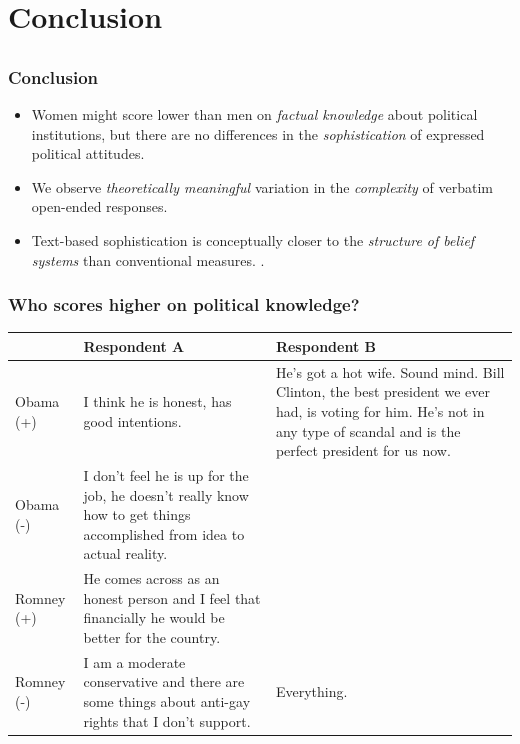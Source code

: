 \documentclass{beamer}
\begin{document}
\section{Conclusion}
\subsection{}
\begin{frame}%
  \frametitle{Conclusion}
  \begin{itemize}
\item Women might score lower than men on \emph{factual knowledge} about political institutions, but there are no differences in the \emph{sophistication} of expressed political attitudes.

\hspace{1em}
\item We observe \emph{theoretically meaningful} variation in the \emph{complexity} of verbatim open-ended responses.
\item Text-based sophistication is conceptually closer to the \emph{structure of belief systems} than conventional measures. \citep[e.g.,][]{tetlock1983cognitive,luskin1987measuring}.
\end{itemize}
\end{frame}

\begin{frame}%
\frametitle{Who scores higher on political knowledge?}
\begin{table}[ht]\footnotesize\centering
\begin{tabular}{l|p{4.5cm}|p{4.5cm}}
   \toprule
    & \textbf{Respondent A} & \textbf{Respondent B} \\ 
    \midrule
  Obama (+) & I think he is honest, has good intentions. & He's got a hot wife. Sound mind. Bill Clinton, the best president we ever had, is voting for him. He's not in any type of scandal and is the perfect president for us now. \\ \hdashline
  Obama (-) & I don't feel he is up for the job, he doesn't really know how to get things accomplished from idea to actual reality. &  \\ \hdashline
  Romney (+) & He comes across as an honest person and I feel that financially he would be better for the country. &  \\ \hdashline
  Romney (-) & I am a moderate conservative and there are some things about anti-gay rights that I don't support. & Everything. \\
    \bottomrule
 \end{tabular}
\end{table}
\end{frame}
\end{document}
